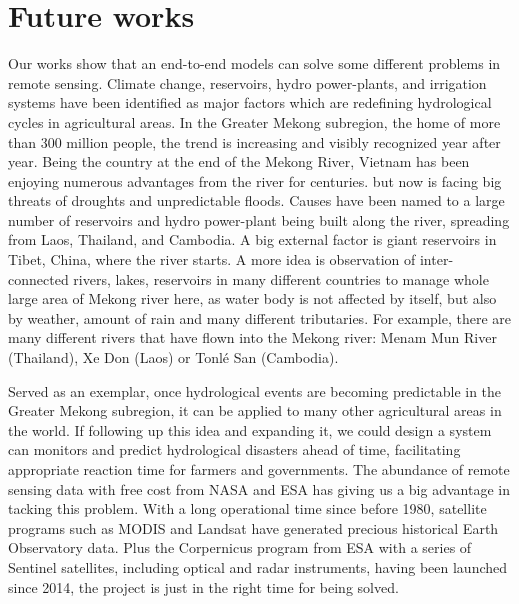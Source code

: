 \section{Future works}

Our works show that an end-to-end models can solve some different problems in remote sensing. Climate change, reservoirs, hydro power-plants, and irrigation systems have been identified as major factors which are redefining hydrological cycles in agricultural areas. In the Greater Mekong subregion, the home of more than 300 million people, the trend is increasing and visibly recognized year after year. Being the country at the end of the Mekong River, Vietnam has been enjoying numerous advantages from the river for centuries. but now is facing big threats of droughts and unpredictable floods. Causes have been named to a large number of reservoirs and hydro power-plant being built along the river, spreading from Laos, Thailand, and Cambodia. A big external factor is giant reservoirs in Tibet, China, where the river starts. A more idea is observation of inter-connected rivers, lakes, reservoirs in many different countries to manage whole large area of Mekong river here, as water body is not affected by itself, but also by weather, amount of rain and many different tributaries. For example, there are many different rivers that have flown into the Mekong river: Menam Mun River (Thailand), Xe Don (Laos) or Tonlé San (Cambodia). 

Served as an exemplar, once hydrological events are becoming predictable in the Greater Mekong subregion, it can be applied to many other agricultural areas in the world. If following up this idea and expanding it, we could design a system can monitors and predict hydrological disasters ahead of time, facilitating appropriate reaction time for farmers and governments. The abundance of remote sensing data with free cost from NASA and ESA has giving us a big advantage in tacking this problem. With a long operational time since before 1980, satellite programs such as MODIS and Landsat have generated precious historical Earth Observatory data. Plus the Corpernicus program from ESA with a series of Sentinel satellites, including optical and radar instruments, having been launched since 2014, the project is just in the right time for being solved.